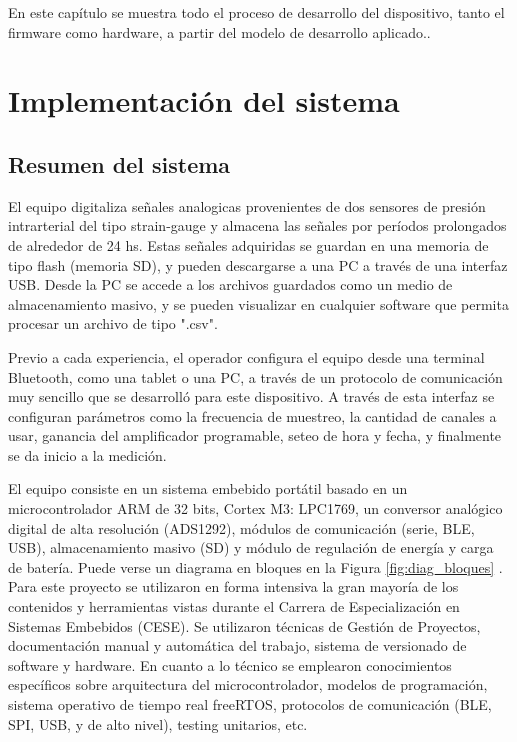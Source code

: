 
En este capítulo se muestra todo el proceso de desarrollo del dispositivo, tanto el firmware como hardware, a partir del modelo de desarrollo aplicado..


\section{Implementación del sistema}

\subsection{Resumen del sistema}

El equipo digitaliza señales analogicas provenientes de dos sensores de presión intrarterial del tipo strain-gauge y almacena las señales por períodos prolongados de alrededor de 24 hs. Estas señales adquiridas se guardan en una memoria de tipo flash (memoria SD), y pueden descargarse a una PC a través de una interfaz USB. Desde la PC se accede a los archivos guardados como un medio de almacenamiento masivo, y se pueden visualizar en cualquier software que permita procesar un archivo de tipo ".csv".

Previo a cada experiencia, el operador configura el equipo desde una terminal Bluetooth, como una tablet o una PC, a través de un protocolo de comunicación muy sencillo que se desarrolló para este dispositivo. A través de esta interfaz se configuran parámetros como la frecuencia de muestreo, la cantidad de canales a usar, ganancia del amplificador programable, seteo de hora y fecha, y finalmente se da inicio a la medición. 

El equipo consiste en un sistema embebido portátil basado en un microcontrolador ARM de 32 bits, Cortex M3: LPC1769, un conversor analógico digital de alta resolución (ADS1292), módulos de comunicación (serie, BLE, USB), almacenamiento masivo (SD) y módulo de regulación de energía y carga de batería. Puede verse un diagrama en bloques en la Figura \ref{fig:diag_bloques} . Para este proyecto se utilizaron en forma intensiva la gran mayoría de los contenidos y herramientas vistas durante el Carrera de Especialización en Sistemas Embebidos (CESE). Se utilizaron técnicas de Gestión de Proyectos, documentación manual y automática del trabajo, sistema de versionado de software y hardware. En cuanto a lo técnico se emplearon conocimientos específicos sobre arquitectura del microcontrolador, modelos de programación, sistema operativo de tiempo real freeRTOS, protocolos de comunicación (BLE, SPI, USB, y de alto nivel), testing unitarios, etc.


